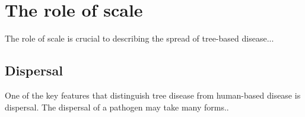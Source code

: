 \section{The role of scale}
The role of scale is crucial to describing the spread of tree-based disease...
\blindtext

\subsection{Dispersal}
\label{ch2:dispersal}
One of the key features that distinguish tree disease from human-based disease is dispersal. The dispersal of a pathogen may take many forms..
\blindtext

